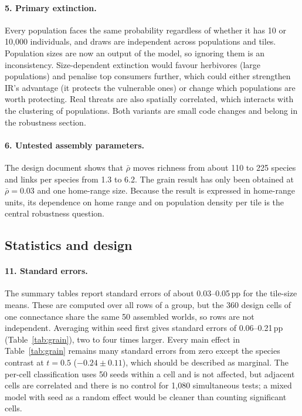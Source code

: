 \documentclass[11pt,a4paper]{article}
\newcommand{\pp}{\,pp}
\newcommand{\rhobar}{\bar{\rho}}
\begin{document}
\paragraph{5. Primary extinction.} Every population faces the same probability regardless of whether it has
10 or 10,000 individuals, and draws are independent across populations and tiles. Population sizes are now
an output of the model, so ignoring them is an inconsistency. Size-dependent extinction would favour
herbivores (large populations) and penalise top consumers further, which could either strengthen IR's
advantage (it protects the vulnerable ones) or change which populations are worth protecting. Real threats
are also spatially correlated, which interacts with the clustering of populations. Both variants are small
code changes and belong in the robustness section.

\paragraph{6. Untested assembly parameters.} The design document shows that $\rhobar$ moves richness from
about 110 to 225 species and links per species from 1.3 to 6.2. The grain result has only been obtained at
$\rhobar=0.03$ and one home-range size. Because the result is expressed in home-range units, its dependence
on home range and on population density per tile is the central robustness question.

\subsection{Statistics and design}\label{sec:stats}
\paragraph{11. Standard errors.} The summary tables report standard errors of about 0.03--0.05\pp{} for
the tile-size means. These are computed over all rows of a group, but the 360 design cells of one
connectance share the same 50 assembled worlds, so rows are not independent. Averaging within seed first
gives standard errors of 0.06--0.21\pp{} (Table~\ref{tab:grain}), two to four times larger. Every main
effect in Table~\ref{tab:grain} remains many standard errors from zero except the species contrast at
$t=0.5$ ($-0.24\pm0.11$), which should be described as marginal. The per-cell classification uses 50 seeds
within a cell and is not affected, but adjacent cells are correlated and there is no control for 1,080
simultaneous tests; a mixed model with seed as a random effect would be cleaner than counting significant
cells.
\end{document}
